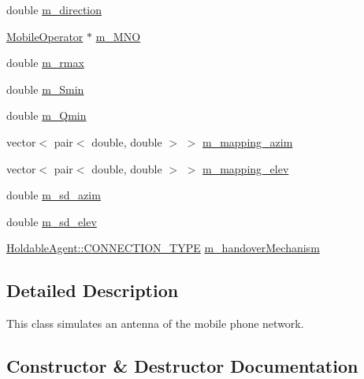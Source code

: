 \begin{DoxyCompactItemize}
\item 
double \mbox{\hyperlink{class_antenna_ac8984b2ecb6fd5f2e1eaef132f0175cb}{m\+\_\+direction}}
\item 
\mbox{\hyperlink{class_mobile_operator}{Mobile\+Operator}} $\ast$ \mbox{\hyperlink{class_antenna_a775a081edfeefcf293bf3ffb3c19013e}{m\+\_\+\+M\+NO}}
\item 
double \mbox{\hyperlink{class_antenna_a7b8fda5c94e7cf03c14a0fe5447e5d46}{m\+\_\+rmax}}
\item 
double \mbox{\hyperlink{class_antenna_a55c98e1d697184199f908f88ae364886}{m\+\_\+\+Smin}}
\item 
double \mbox{\hyperlink{class_antenna_a8f58c6af021dc13d6d76d390daaf59d7}{m\+\_\+\+Qmin}}
\item 
vector$<$ pair$<$ double, double $>$ $>$ \mbox{\hyperlink{class_antenna_a0d4e25b246a30e3e6fdb303bed85e7da}{m\+\_\+mapping\+\_\+azim}}
\item 
vector$<$ pair$<$ double, double $>$ $>$ \mbox{\hyperlink{class_antenna_a71b55ca74697d064e231829343209fec}{m\+\_\+mapping\+\_\+elev}}
\item 
double \mbox{\hyperlink{class_antenna_af9ed0b78826b52bd60c497eb7f87be3d}{m\+\_\+sd\+\_\+azim}}
\item 
double \mbox{\hyperlink{class_antenna_aeb2ce4a95682b9ecff1395dfa857c089}{m\+\_\+sd\+\_\+elev}}
\item 
\mbox{\hyperlink{class_holdable_agent_ae2c334b004d7b9c5a999cf2618e4e518}{Holdable\+Agent\+::\+C\+O\+N\+N\+E\+C\+T\+I\+O\+N\+\_\+\+T\+Y\+PE}} \mbox{\hyperlink{class_antenna_a4fa1f72704f7a10fa54498b839c76833}{m\+\_\+handover\+Mechanism}}
\end{DoxyCompactItemize}


\subsection{Detailed Description}
This class simulates an antenna of the mobile phone network. 

\subsection{Constructor \& Destructor Documentation}
\mbox{\label{class_antenna_a39c505109145908a5b032a16a2fe53c4}} 
